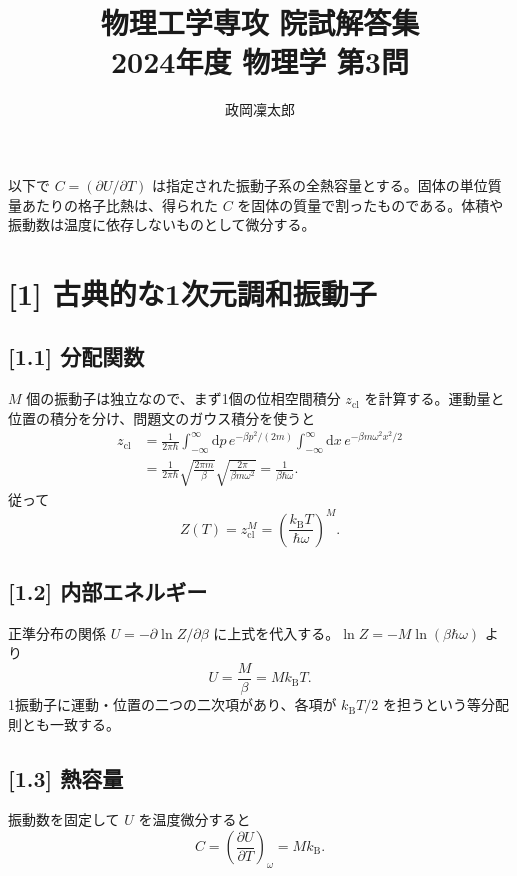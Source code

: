 \documentclass[11pt,a4paper]{article}
\title{物理工学専攻 院試解答集\\2024年度 物理学 第3問}
\author{政岡凜太郎}
\date{}
\begin{document}
\maketitle

以下で $C=(\partial U/\partial T)$ は指定された振動子系の全熱容量とする。固体の単位質量あたりの格子比熱は、得られた $C$ を固体の質量で割ったものである。体積や振動数は温度に依存しないものとして微分する。

\section*{[1] 古典的な1次元調和振動子}
\subsection*{[1.1] 分配関数}
$M$ 個の振動子は独立なので、まず1個の位相空間積分 $z_{\mathrm{cl}}$ を計算する。運動量と位置の積分を分け、問題文のガウス積分を使うと
\begin{align}
z_{\mathrm{cl}}
&=\frac{1}{2\pi\hbar}
 \int_{-\infty}^{\infty}\!\mathrm dp\,
 e^{-\beta p^2/(2m)}
 \int_{-\infty}^{\infty}\!\mathrm dx\,
 e^{-\beta m\omega^2x^2/2}\\
&=\frac{1}{2\pi\hbar}
 \sqrt{\frac{2\pi m}{\beta}}
 \sqrt{\frac{2\pi}{\beta m\omega^2}}
 =\frac{1}{\beta\hbar\omega}.
\end{align}
従って
\begin{equation}
\boxed{Z(T)=z_{\mathrm{cl}}^M
 =\left(\frac{k_{\mathrm B}T}{\hbar\omega}\right)^M}.
\end{equation}

\subsection*{[1.2] 内部エネルギー}
正準分布の関係 $U=-\partial\ln Z/\partial\beta$ に上式を代入する。$\ln Z=-M\ln(\beta\hbar\omega)$ より
\begin{equation}
\boxed{U=\frac{M}{\beta}=Mk_{\mathrm B}T}.
\end{equation}
1振動子に運動・位置の二つの二次項があり、各項が $k_{\mathrm B}T/2$ を担うという等分配則とも一致する。

\subsection*{[1.3] 熱容量}
振動数を固定して $U$ を温度微分すると
\begin{equation}
\boxed{C=\left(\frac{\partial U}{\partial T}\right)_{\omega}=Mk_{\mathrm B}}.
\end{equation}
\end{document}
